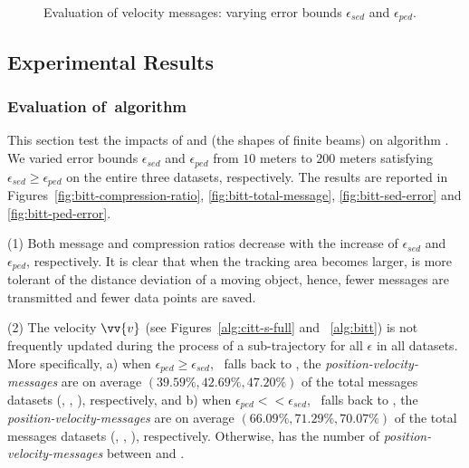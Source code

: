 {{\begin{figure}[tb!]
	\vspace{-1ex}
	\caption{\small Evaluation of velocity messages: varying error bounds $\epsilon_{sed}$ and $\epsilon_{ped}$.}
	\label{fig:speed-message}
	\vspace{-1ex}
\end{figure}
}%



\subsection{Experimental Results}

\subsubsection{Evaluation of~algorithm \bitt}
This section test the impacts of \ped and \sed (\ie the shapes of finite beams) on algorithm \bitt. We varied error bounds $\epsilon_{sed}$ and $\epsilon_{ped}$ from $10$ meters to $200$ meters satisfying $\epsilon_{sed} \ge \epsilon_{ped}$ on the entire three datasets, respectively. The results are reported in Figures~\ref{fig:bitt-compression-ratio}, \ref{fig:bitt-total-message}, \ref{fig:bitt-sed-error} and \ref{fig:bitt-ped-error}.


\ni (1) Both message and compression ratios decrease with the increase of $\epsilon_{sed}$ and $\epsilon_{ped}$, respectively. It is clear that when the tracking area becomes larger, \bitt is more tolerant of the distance deviation of a moving object, hence, fewer messages are transmitted and fewer data points are saved.

\ni (2) The velocity  $\vv{v}$ (see Figures~\ref{alg:citt-s-full} and ~\ref{alg:bitt}) is not frequently updated during the process of a sub-trajectory for all $\epsilon$ in all datasets. More specifically, a) when $\epsilon_{ped} \ge \epsilon_{sed}$, \ie~\bitt falls back to \citt, the \emph{position-velocity-messages} are on average $(39.59\%, 42.69\%, 47.20\%)$ of the total messages \wrt datasets (\mopsi, \sercar, \geolife), respectively, and b) when $\epsilon_{ped} << \epsilon_{sed}$, \ie~\bitt falls back to \sitt, the \emph{position-velocity-messages} are on average $(66.09\%, 71.29\%, 70.07\%)$ of the total messages \wrt datasets (\mopsi, \sercar, \geolife), respectively. Otherwise, \bitt has the number of \emph{position-velocity-messages} between \citt and \sitt.

}
